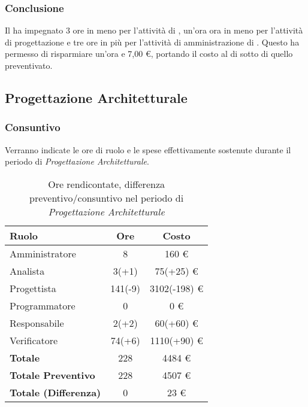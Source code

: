 \subsubsection{Conclusione}
Il  ha impegnato 3 ore in meno per l'attivit\`a di , un'ora ora in meno per l'attivit\`a di progettazione e tre ore in più per l'attivit\`a di amministrazione di . Questo ha permesso di risparmiare un'ora e 7,00 \euro{}, portando il costo  al di sotto di quello preventivato.

\newpage


\subsection{Progettazione Architetturale}
\subsubsection{Consuntivo}
Verranno indicate le ore di ruolo e le spese effettivamente sostenute durante il periodo di \textit{Progettazione Architetturale}.

\begin{table}[H]
	\centering
	\begin{tabular}{ l c c }
		\textbf{Ruolo} & \textbf{Ore} & \textbf{Costo} \\
		\hline
		Amministratore & 8 & 160 \euro{} \\
		Analista & 3(+1) & 75(+25) \euro{} \\
		Progettista & 141(-9) & 3102(-198) \euro{} \\
		Programmatore & 0 & 0 \euro{} \\
		Responsabile & 2(+2) & 60(+60) \euro{} \\
		Verificatore & 74(+6) & 1110(+90) \euro{} \\
		\hline
		\textbf{Totale \glossaryItem{Consuntivo}} & 228 & 4484 \euro{} \\
		\hline
		\textbf{Totale Preventivo} & 228 & 4507 \euro{} \\
		\hline
		\textbf{Totale (Differenza)} & 0 & 23 \euro{} \\
		\hline
	\end{tabular}
	\caption{Ore rendicontate, differenza preventivo/consuntivo nel periodo di \textit{Progettazione Architetturale}}
\end{table}



